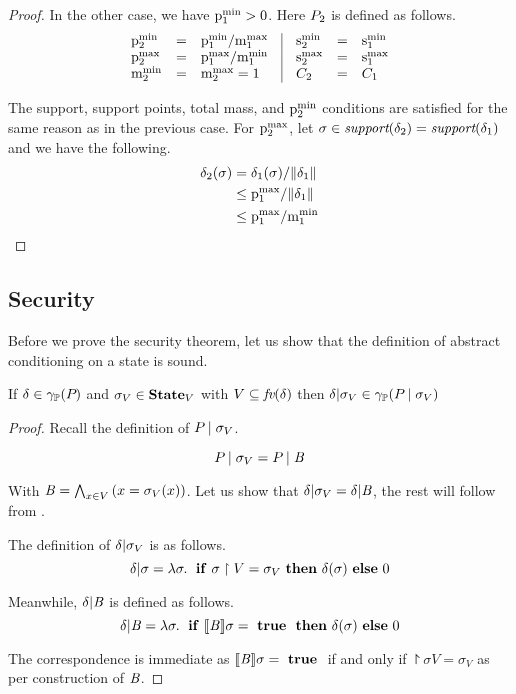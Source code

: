 \begin{proof}
In the other case, we have $ \mathrm{p}^\mathrm{min}_{1} > 0 $. Here $ P_{2} $ is
defined as follows.
\[
\begin{array}{lcl@{\hspace{0.35cm}}|@{\hspace{0.35cm}}lcl}
\pmin{2} &=& \pmin{1} / \mmax{1} &
\smin{2} &=& \smin{1}\\
\pmax{2} &=& \pmax{1} / \mmin{1} &
\smax{2} &=&\smax{1} \\
\mmin{2} &=& \mmax{2} = 1 & \getpoly{2} &=& \getpoly{1} \\
\end{array}
\]

The support, support points, total mass, and $ \mathrm{p}^\mathrm{min}_{2} $ conditions are satisfied for the same
reason as in the previous case. For $ \mathrm{p}^\mathrm{max}_{2} $, let
$ \sigma \in \textit{support}(\delta_2) = \textit{support}(\delta_1) $ and we have
the following.
\begin{align*}
\delta_2(\sigma)
 & = \delta_1(\sigma) / \mathord{\parallel}\delta_1\mathord{\parallel} \\
 & \leq \mathrm{p}^\mathrm{max}_{1} / \mathord{\parallel}\delta_1\mathord{\parallel} \\
 & \leq \mathrm{p}^\mathrm{max}_{1} / \mathrm{m}^\mathrm{min}_{1}
\end{align*}
\end{proof}

\subsection{Security}

Before we prove the security theorem, let us show that the definition
of abstract conditioning on a state is sound.

\begin{lemma} \label{lem:pp:scond}
If $ \delta \in \gamma_{\mathbb{P}}(P_{}) $ and $ \sigma_V \in \textbf{State}_{V} $
with $ V \subseteq \textit{fv}(\delta) $ then
$ \delta | \sigma_V \in \gamma_{\mathbb{P}}(P_{} \mid \sigma_V) $
\end{lemma}

\begin{proof} Recall the definition of $ P_{} \mid \sigma_V $.

$$ P_{} \mid \sigma_V = P_{} \mid \mathit{B} $$

With $ \mathit{B} = \bigwedge_{x \in V} \left( x = \sigma_V(x) \right) $. Let us
show that $ \delta | \sigma_V = \delta | \mathit{B} $, the
rest will follow from .

The definition of $ \delta | \sigma_V $ is as follows.
$$ \delta | \sigma
= \lambda \sigma . \; \text{ \textbf{if} } \sigma \upharpoonright V = \sigma_V
\text{ \textbf{then} } \delta(\sigma) \text{ \textbf{else} } 0 $$

Meanwhile, $ \delta | \mathit{B} $ is defined as follows.
$$ \delta | \mathit{B}
= \lambda \sigma . \; \text{ \textbf{if} } [\![{\mathit{B}}]\!]{\sigma}
= \text{ \textbf{true} } \text{ \textbf{then} } \delta(\sigma) \text{ \textbf{else} } 0 $$

The correspondence is immediate as $ [\![{\mathit{B}}]\!]{\sigma} = \text{ \textbf{true} } $
if and only if $ \project{\sigma}{V} = \sigma_V $ as per construction
of $ \mathit{B} $.
\end{proof}

